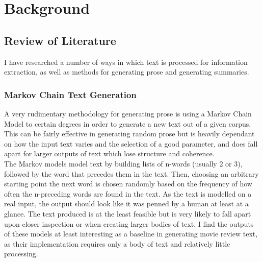 \chapter{\label{ch:2-litreview}Background}


\section{Review of Literature}
I have researched a number of ways in which text is processed for information extraction, as well as methods for generating prose and generating summaries.
\subsection{Markov Chain Text Generation}
A very rudimentary methodology for generating prose is using a Markov Chain Model to certain degrees in order to generate a new text out of a given corpus. This can be fairly effective in generating random prose but is heavily dependant on how the input text varies and the selection of a good parameter, and does fall apart for larger outputs of text which lose structure and coherence.\\ %

The Markov models model text by building lists of n-words (usually 2 or 3), followed by the word that precedes them in the text. Then, choosing an arbitrary starting point the next word is chosen randomly based on the frequency of how often the n-preceding words are found in the text. As the text is modelled on a real input, the output should look like it was penned by a human at least at a glance. The text produced is at the least feasible but is very likely to fall apart upon closer inspection or when creating larger bodies of text. I find the outputs of these models at least interesting as a baseline in generating movie review text, as their implementation requires only a body of text and relatively little processing.

